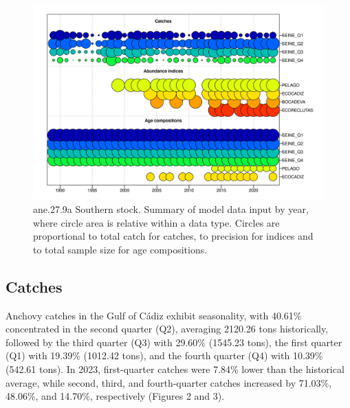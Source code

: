 \documentclass[
]{article}
\begin{document}
\begin{figure}[H]

{\centering \includegraphics[width=0.95\linewidth]{report/run/S1.0_4FLEETS_SelECO_RecIndex_Mnewfix/fig_input_data} 

}

\caption{ane.27.9a Southern stock. Summary of model data input by year, where circle area is relative within a data type. Circles are proportional to total catch for catches, to precision for indices and to total sample size for age compositions.}\label{fig:unnamed-chunk-28}
\end{figure}

\hypertarget{catches}{%
\subsection{Catches}\label{catches}}

Anchovy catches in the Gulf of Cádiz exhibit seasonality, with 40.61\%
concentrated in the second quarter (Q2), averaging 2120.26 tons
historically, followed by the third quarter (Q3) with 29.60\% (1545.23
tons), the first quarter (Q1) with 19.39\% (1012.42 tons), and the
fourth quarter (Q4) with 10.39\% (542.61 tons). In 2023, first-quarter
catches were 7.84\% lower than the historical average, while second,
third, and fourth-quarter catches increased by 71.03\%, 48.06\%, and
14.70\%, respectively (Figures 2 and 3).
\end{document}
